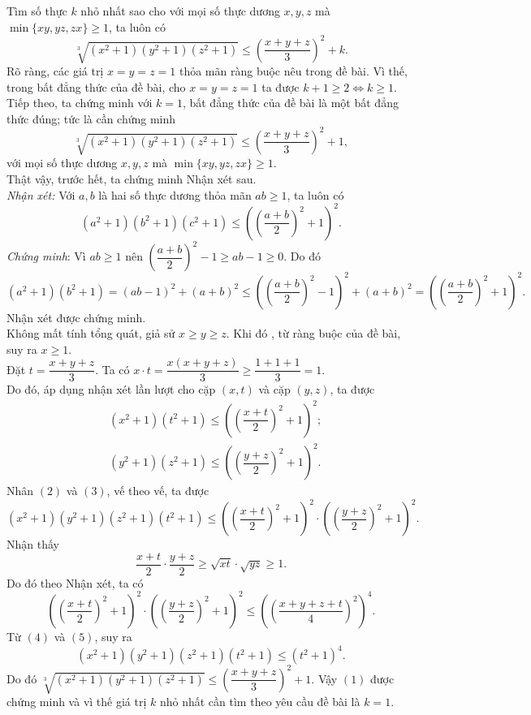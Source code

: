 \begin{bt}%
	Tìm số thực $k$ nhỏ nhất sao cho với mọi số thực dương $x ,y, z$ mà $\min \{xy, yz, zx\} \geq 1$, ta luôn có $$ \sqrt[3]{(x^2+1)(y^2+1)(z^2+1)} \leq \left( \dfrac{x+y+z}{3}\right)^2 +k.$$
	\loigiai
	{ Rõ ràng, các giá trị $x=y=z=1$ thỏa mãn ràng buộc nêu trong đề bài. Vì thế, trong bất đẳng thức của đề bài, cho $x=y=z=1$ ta được $k+1 \geq 2 \Leftrightarrow k \geq 1$.
		Tiếp theo, ta chứng minh với $k=1$, bất đẳng thức của đề bài là một bất đẳng thức đúng; tức là cần chứng minh \[\sqrt[3]{(x^2+1)(y^2+1)(z^2+1)} \leq \left( \dfrac{x+y+z}{3}\right)^2 +1,\tag{1}\]
		với mọi số thực dương $x ,y, z$ mà $\min \{xy, yz, zx\} \geq 1.$\\
		Thật vậy, trước hết, ta chứng minh Nhận xét sau.\\
		{\it Nhận xét:}
		Với $a, b $ là hai số thực dương thỏa mãn $ab \geq 1$, ta luôn có $$(a^2+1)(b^2+1)(c^2+1) \leq \left( \left( \dfrac{a+b}{2}\right)^2+1\right)^2.$$
		{\it Chứng minh}: Vì $ab \geq 1$ nên $\left( \dfrac{a+b}{2}\right)^2-1\geq ab-1\geq 0.$
		Do đó 
		$$(a^2+1)(b^2+1)=(ab-1)^2+(a+b)^2 \leq \left( \left( \dfrac{a+b}{2}\right)^2-1\right)^2 +(a+b)^2=\left( \left( \dfrac{a+b}{2}\right)^2+1\right)^2.$$
		Nhận xét được chứng minh.\\
		Không mất tính tổng quát, giả sử $x \geq y \geq z.$ Khi đó , từ ràng buộc của đề bài, suy ra $x \geq 1.$\\
		Đặt $t= \dfrac{x+y+z}{3}.$ Ta có $x\cdot t = \dfrac{x(x+y+z)}{3} \geq \dfrac{1+1+1}{3}=1$.\\
		Do đó, áp dụng nhận xét lần lượt cho cặp $(x,t) $ và cặp $(y,z)$, ta được
		{\allowdisplaybreaks
			\begin{align*}
		&(x^2+1)(t^2+1) \leq \left( \left( \dfrac{x+t}{2}\right)^2+1\right)^2; \tag{2}\\
		& (y^2+1)(z^2+1) \leq \left( \left( \dfrac{y+z}{2}\right)^2+1\right)^2. \tag{3} 
		\end{align*}}Nhân $(2)$ và $(3)$, vế theo vế, ta được
		\[ (x^2+1)(y^2+1)(z^2+1)(t^2+1) \leq \left( \left( \dfrac{x+t}{2}\right)^2+1\right)^2 \cdot \left( \left( \dfrac{y+z}{2}\right)^2+1\right)^2. \tag{4} \]
		Nhận thấy $$ \dfrac{x+t}{2} \cdot \dfrac{y+z}{2} \geq \sqrt{xt} \cdot \sqrt{yz} \geq 1.$$
		Do đó theo Nhận xét, ta có \[\left( \left( \dfrac{x+t}{2}\right)^2+1\right)^2 \cdot \left( \left( \dfrac{y+z}{2}\right)^2+1\right)^2 \leq \left( \left( \dfrac{x+y+z+t}{4}\right)^2 \right)^4 . \tag{5}\]
		Từ $(4)$ và $(5)$, suy ra $$(x^2+1)(y^2+1)(z^2+1)(t^2+1) \leq (t^2+1)^4.$$ Do đó $\sqrt[3]{(x^2+1)(y^2+1)(z^2+1)} \leq \left( \dfrac{x+y+z}{3}\right)^2 +1.$ Vậy $(1)$ được chứng minh và vì thế giá trị $k$ nhỏ nhất cần tìm theo yêu cầu đề bài là $k=1.$
}
\end{bt}
